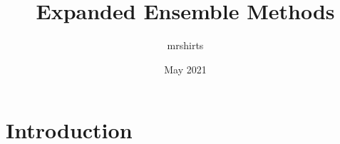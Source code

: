 \documentclass{article}
\title{Expanded Ensemble Methods}
\author{mrshirts }
\date{May 2021}
\begin{document}
\maketitle

\section{Introduction}
\end{document}

